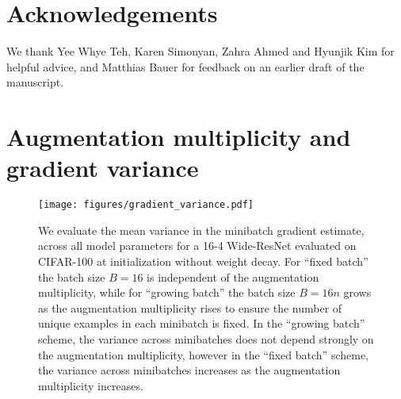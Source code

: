 \documentclass{article}
\begin{document}
 \section*{Acknowledgements}
We thank Yee Whye Teh, Karen Simonyan, Zahra Ahmed and Hyunjik Kim for helpful advice, and Matthias Bauer for feedback on an earlier draft of the manuscript.

\newpage






\appendix
	


	



























\section{Augmentation multiplicity and gradient variance}
\label{app:variance}

\begin{figure}[h]
\centering
\texttt{[image: figures/gradient\_variance.pdf]}
\caption{We evaluate the mean variance in the minibatch gradient estimate, across all model parameters for a 16-4 Wide-ResNet evaluated on CIFAR-100 at initialization without weight decay. For ``fixed batch'' the batch size $B=16$ is independent of the augmentation multiplicity, while for ``growing batch'' the batch size $B=16n$ grows as the augmentation multiplicity rises to ensure the number of unique examples in each minibatch is fixed. In the ``growing batch'' scheme, the variance across minibatches does not depend strongly on the augmentation multiplicity, however in the ``fixed batch'' scheme, the variance across minibatches increases as the augmentation multiplicity increases.
}
\label{fig:variance}
\end{figure}
\end{document}
